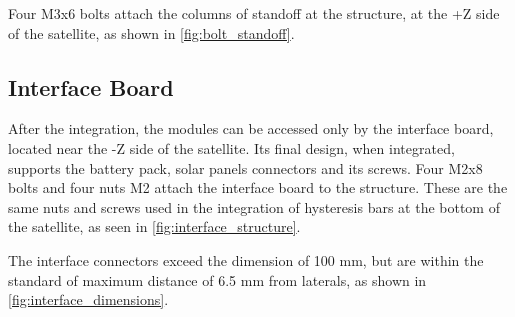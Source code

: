 
Four M3x6 bolts attach the columns of standoff at the structure, at the +Z side of the satellite, as shown in \autoref{fig:bolt_standoff}.


\subsection{Interface Board}
After the integration, the modules can be accessed only by the interface board, located near the -Z side of the satellite. Its final design, when integrated, supports the battery pack, solar panels connectors and its screws. Four M2x8 bolts and four nuts M2 attach the interface board to the structure. These are the same nuts and screws used in the integration of hysteresis bars at the bottom of the satellite, as seen in \autoref{fig:interface_structure}. 


The interface connectors exceed the dimension of 100 mm, but are within the standard of maximum distance of 6.5 mm from laterals, as shown in \autoref{fig:interface_dimensions}.




